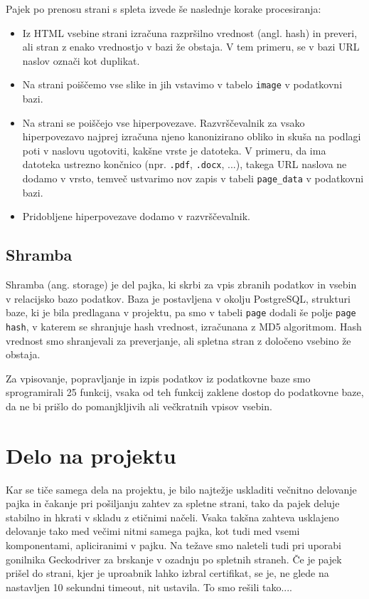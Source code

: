 \documentclass[conference]{IEEEtran}
\begin{document}
	Pajek po prenosu strani s spleta izvede še naslednje korake procesiranja:
	\begin{itemize}
		\item Iz HTML vsebine strani izračuna razpršilno vrednost (angl. hash) in preveri, ali stran z enako vrednostjo v bazi že obstaja. V tem primeru, se v bazi URL naslov označi kot duplikat.
		\item Na strani poiščemo vse slike in jih vstavimo v tabelo \texttt{image} v podatkovni bazi.
		\item Na strani se poiščejo vse hiperpovezave. Razvrščevalnik za vsako hiperpovezavo najprej izračuna njeno kanonizirano obliko in skuša na podlagi poti v naslovu ugotoviti, kakšne vrste je datoteka. V primeru, da ima datoteka ustrezno končnico (npr. \texttt{.pdf}, \texttt{.docx}, ...), takega URL naslova ne dodamo v vrsto, temveč ustvarimo nov zapis v tabeli \texttt{page\_data} v podatkovni bazi.
		\item Pridobljene hiperpovezave dodamo v razvrščevalnik.
	\end{itemize}
	
	\subsection{Shramba}
	
	Shramba (ang. storage) je del pajka, ki skrbi za vpis zbranih podatkov in vsebin v relacijsko bazo podatkov. Baza je postavljena v okolju PostgreSQL, strukturi baze, ki je bila predlagana v projektu, pa smo v tabeli \texttt{page} dodali še polje \texttt{page hash}, v katerem se shranjuje hash vrednost, izračunana z MD5 algoritmom. Hash vrednost smo shranjevali za preverjanje, ali spletna stran z določeno vsebino že obstaja. 
	
	Za vpisovanje, popravljanje in izpis podatkov iz podatkovne baze smo sprogramirali 25 funkcij, vsaka od teh funkcij zaklene dostop do podatkovne baze, da ne bi prišlo do pomanjkljivih ali večkratnih vpisov vsebin.
	
	\section{Delo na projektu}
	
	Kar se tiče samega dela na projektu, je bilo najtežje uskladiti večnitno delovanje pajka in čakanje pri pošiljanju zahtev za spletne strani, tako da pajek deluje stabilno in hkrati v skladu z etičnimi načeli. Vsaka takšna zahteva usklajeno delovanje tako med večimi nitmi samega pajka, kot tudi med vsemi komponentami, apliciranimi v pajku.
	Na težave smo naleteli tudi pri uporabi gonilnika Geckodriver za brskanje v ozadnju po spletnih straneh. Če je pajek prišel do strani, kjer je uproabnik lahko izbral certifikat, se je, ne glede na nastavljen 10 sekundni timeout, nit ustavila. To smo rešili tako....
	
\end{document}
